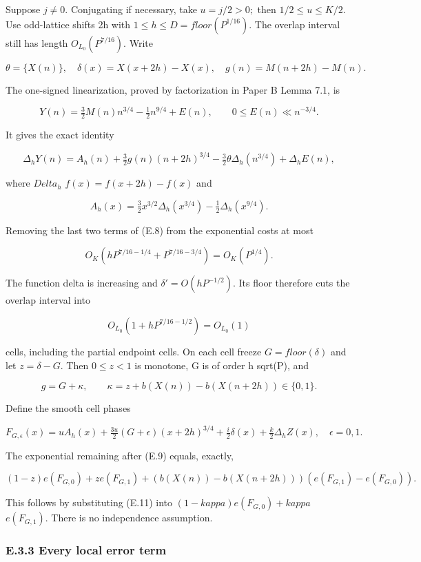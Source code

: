 \documentclass[11pt,a4paper]{article}
\begin{document}
Suppose \(j\ne 0.\) Conjugating if necessary, take \(u=j/2>0;\) then
\(1/2\le u\le K/2.\) Use odd-lattice shifts 2h with
\(1\le h\le D=floor(P^{1/16}).\) The overlap interval still has length
\(O_{L_0}(P^{7/16}).\) Write

\[
 \theta=\{X(n)\},\quad \delta(x)=X(x+2h)-X(x),\quad
 g(n)=M(n+2h)-M(n).
\]

The one-signed linearization, proved by factorization in Paper B Lemma
7.1, is

\[
 Y(n)=\tfrac32 M(n)n^{3/4}-\tfrac12n^{9/4}+E(n),\qquad
 0\le E(n)\ll n^{-3/4}.
\]

It gives the exact identity

\[
 \Delta_hY(n)=A_h(n)+\tfrac32g(n)(n+2h)^{3/4}
       -\tfrac32\theta\Delta_h(n^{3/4})+\Delta_hE(n),
 \tag{E.8}
\]

where \(Delta_h\) \(f(x)=f(x+2h)-f(x)\) and

\[
 A_h(x)=\tfrac32x^{3/2}\Delta_h(x^{3/4})
                         -\tfrac12\Delta_h(x^{9/4}).
\]

Removing the last two terms of (E.8) from the exponential costs at most

\[
 O_K\left(hP^{7/16-1/4}+P^{7/16-3/4}\right)=O_K(P^{1/4}).
 \tag{E.9}
\]

The function delta is increasing and \(\delta'=O(hP^{-1/2}).\) Its floor
therefore cuts the overlap interval into

\[
 O_{L_0}(1+hP^{7/16-1/2})=O_{L_0}(1)
 \tag{E.10}
\]

cells, including the partial endpoint cells. On each cell freeze
\(G=floor(\delta)\) and let \(z=\delta-G.\) Then \(0\le z<1\) is
monotone, G is of order h sqrt(P), and

\[
 g=G+\kappa,\qquad
 \kappa=z+b(X(n))-b(X(n+2h))\in\{0,1\}.
 \tag{E.11}
\]

Define the smooth cell phases

\[
 F_{G,\epsilon}(x)=u A_h(x)+\tfrac{3u}{2}(G+\epsilon)(x+2h)^{3/4}
        +\tfrac i2\delta(x)+\tfrac k2\Delta_hZ(x),\quad \epsilon=0,1.
\]

The exponential remaining after (E.9) equals, exactly,

\[
 (1-z)e(F_{G,0})+z e(F_{G,1})+
 (b(X(n))-b(X(n+2h)))(e(F_{G,1})-e(F_{G,0})).
 \tag{E.12}
\]

This follows by substituting (E.11) into \((1-kappa)e(F_{G,0})+kappa\)
\(e(F_{G,1}).\) There is no independence assumption.

\subsubsection{E.3.3 Every local error
term}\label{e.3.3-every-local-error-term}
\end{document}
